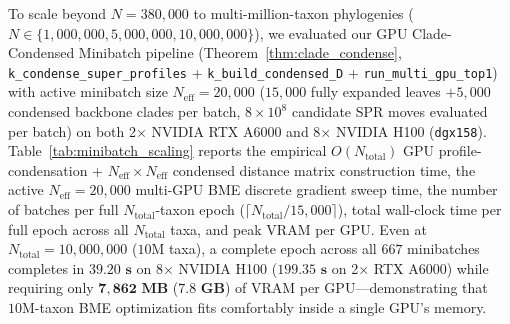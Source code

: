 \documentclass[11pt,a4paper]{article}
\theoremstyle{definition}
\begin{document}
To scale beyond $N = 380{,}000$ to multi-million-taxon phylogenies ($N \in \{1{,}000{,}000, 5{,}000{,}000, 10{,}000{,}000\}$), we evaluated our GPU Clade-Condensed Minibatch pipeline (Theorem~\ref{thm:clade_condense}, \texttt{k\_condense\_super\_profiles} + \texttt{k\_build\_condensed\_D} + \texttt{run\_multi\_gpu\_top1}) with active minibatch size $N_{\text{eff}} = 20{,}000$ ($15{,}000$ fully expanded leaves $+ 5{,}000$ condensed backbone clades per batch, $8 \times 10^8$ candidate SPR moves evaluated per batch) on both 2$\times$ NVIDIA RTX A6000 and 8$\times$ NVIDIA H100 (\texttt{dgx158}). Table~\ref{tab:minibatch_scaling} reports the empirical $O(N_{\text{total}})$ GPU profile-condensation + $N_{\text{eff}} \times N_{\text{eff}}$ condensed distance matrix construction time, the active $N_{\text{eff}} = 20{,}000$ multi-GPU BME discrete gradient sweep time, the number of batches per full $N_{\text{total}}$-taxon epoch ($\lceil N_{\text{total}} / 15{,}000 \rceil$), total wall-clock time per full epoch across all $N_{\text{total}}$ taxa, and peak VRAM per GPU. Even at $N_{\text{total}} = 10{,}000{,}000$ ($10\text{M}$ taxa), a complete epoch across all $667$ minibatches completes in $\mathbf{39.20\text{ s}}$ on 8$\times$ NVIDIA H100 ($\mathbf{199.35\text{ s}}$ on 2$\times$ RTX A6000) while requiring only $\mathbf{7{,}862\text{ MB}}$ ($\mathbf{7.8\text{ GB}}$) of VRAM per GPU—demonstrating that $10\text{M}$-taxon BME optimization fits comfortably inside a single GPU's memory.

\begin{table}[h!]
\centering
\caption{Empirical Ultra-Scale Clade-Condensed Minibatch Scaling at $N_{\text{total}} = 1{,}000{,}000 \dots 10{,}000{,}000$ Taxa ($N_{\text{eff}} = 20{,}000$) on 2$\times$ NVIDIA RTX A6000 and 8$\times$ NVIDIA H100 (\texttt{dgx158}).}
\label{tab:minibatch_scaling}
\vspace{4pt}
\end{table}
\end{document}
